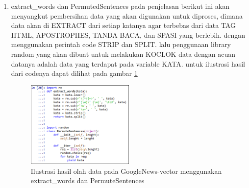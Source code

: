 \begin{enumerate}
\item extract\_words dan PermutedSentences
\subitem pada penjelasan berikut ini akan menyangkut pembersihan data yang akan digunakan untuk diproses, dimana data akan di EXTRACT dari setiap katanya agar terbebas dari data TAG HTML, APOSTROPHES, TANDA BACA, dan SPASI yang berlebih. dengan menggunakan perintah code STRIP dan SPLIT. lalu penggunaan library random yang akan dibuat untuk melakukan KOCLOK data dengan acuan datanya adalah data yang terdapat pada variable KATA. untuk ilustrasi hasil dari codenya dapat dilihat pada gambar \ref{fig19}
\begin{figure}[!htbp]
	\centering
	\includegraphics[width=0.5\textwidth]{figures/fathi/chapter5/hari2/14}
	\caption{Ilustrasi hasil olah data  pada GoogleNews-vector menggunakan extract\_words dan PermuteSentences}
	\label{fig19}
\end{figure}
\end{enumerate}